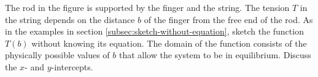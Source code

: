 The rod in the figure is supported by the finger and the string.
The tension $T$ in the string depends on the distance $b$ of the
finger from the free end of the rod. 
As in the examples
in section \ref{subsec:sketch-without-equation}, sketch the function
$T(b)$ without knowing its equation. The domain of the function
consists of the physically possible values of $b$ that allow the
system to be in equilibrium. Discuss the
$x$- and $y$-intercepts.
